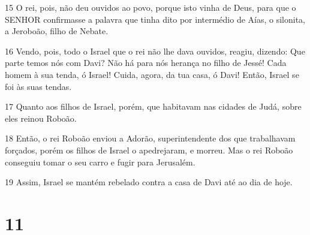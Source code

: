 \par 15 O rei, pois, não deu ouvidos ao povo, porque isto vinha de Deus, para que o SENHOR confirmasse a palavra que tinha dito por intermédio de Aías, o silonita, a Jeroboão, filho de Nebate.
\par 16 Vendo, pois, todo o Israel que o rei não lhe dava ouvidos, reagiu, dizendo: Que parte temos nós com Davi? Não há para nós herança no filho de Jessé! Cada homem à sua tenda, ó Israel! Cuida, agora, da tua casa, ó Davi! Então, Israel se foi às suas tendas.
\par 17 Quanto aos filhos de Israel, porém, que habitavam nas cidades de Judá, sobre eles reinou Roboão.
\par 18 Então, o rei Roboão enviou a Adorão, superintendente dos que trabalhavam forçados, porém os filhos de Israel o apedrejaram, e morreu. Mas o rei Roboão conseguiu tomar o seu carro e fugir para Jerusalém.
\par 19 Assim, Israel se mantém rebelado contra a casa de Davi até ao dia de hoje.

\chapter{11}

